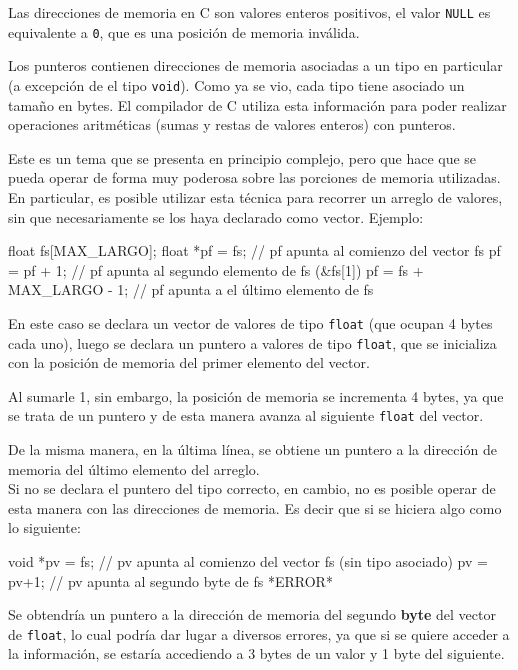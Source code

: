 Las direcciones de memoria en C son valores enteros positivos, el valor
\lstinline!NULL! es equivalente a \lstinline!0!, que es una posición de memoria
inválida.

Los punteros contienen direcciones de memoria asociadas a un tipo en
particular (a excepción de el tipo \lstinline!void!). Como ya se vio, cada
tipo tiene asociado un tamaño en bytes. El compilador de C utiliza esta
información para poder realizar operaciones aritméticas (sumas y restas de
valores enteros) con punteros.

Este es un tema que se presenta en principio complejo, pero que hace que se
pueda operar de forma muy poderosa sobre las porciones de memoria utilizadas.
En particular, es posible utilizar esta técnica para recorrer un arreglo de
valores, sin que necesariamente se los haya declarado como vector. Ejemplo:

\begin{codigo-c-plano}
float fs[MAX_LARGO];
float *pf = fs;           // pf apunta al comienzo del vector fs
pf = pf + 1;              // pf apunta al segundo elemento de fs (&fs[1])
pf = fs + MAX_LARGO - 1;  // pf apunta a el último elemento de fs
\end{codigo-c-plano}

En este caso se declara un vector de valores de tipo \lstinline!float! (que
ocupan 4 bytes cada uno), luego se declara un puntero a valores de tipo
\lstinline!float!, que se inicializa con la posición de memoria del primer
elemento del vector.

Al sumarle 1, sin embargo, la posición de memoria se incrementa 4 bytes, ya
que se trata de un puntero y de esta manera avanza al siguiente
\lstinline!float! del vector.

De la misma manera, en la última línea, se obtiene un puntero a la dirección
de memoria del último elemento del arreglo. \\

Si no se declara el puntero del tipo correcto, en cambio, no es posible operar
de esta manera con las direcciones de memoria.  Es decir que si se hiciera
algo como lo siguiente:

\begin{codigo-c-plano}
void *pv = fs;  // pv apunta al comienzo del vector fs (sin tipo asociado)
pv = pv+1;      // pv apunta al segundo byte de fs *ERROR*
\end{codigo-c-plano}

Se obtendría un puntero a la dirección de memoria del segundo \textbf{byte}
del vector de \lstinline!float!, lo cual podría dar lugar a diversos errores,
ya que si se quiere acceder a la información, se estaría accediendo a 3 bytes
de un valor y 1 byte del siguiente. \\

